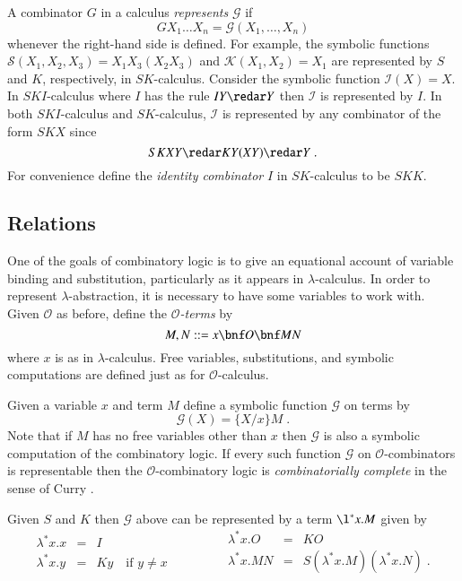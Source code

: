 \documentclass{llncs}
\renewcommand{\rew}{\redar}
\begin{document}
A combinator $G$ in a calculus {\em represents} ${\mathcal G}$ if
\[
GX_1\ldots X_n = {\mathcal G}(X_1,\ldots,X_n)
\]
whenever the right-hand side is defined.  For example, the symbolic
functions
${\mathcal S}(X_1,X_2,X_3) = X_1X_3(X_2X_3)$ and
${\mathcal K}(X_1,X_2) = X_1$
are represented by $S$ and $K$, respectively, 
in $SK$-calculus.
  Consider the
symbolic function
${\mathcal I}(X) = X$. 
In $SKI$-calculus where $I$ has the rule
$IY \rew Y$
then ${\mathcal I}$ is represented by $I$. In both $SKI$-calculus and
$SK$-calculus, ${\mathcal I}$ is represented by any combinator of the
form $SKX$ since
\[
SKXY \redar KY(XY) \redar Y\;.
\]
For convenience define the {\em identity combinator} $I$ in $SK$-calculus to be $SKK$.


\subsection{Relations}
\label{sec:lambda=SK}



One of the goals of combinatory logic is to give an equational account
of variable binding and substitution, particularly as it appears in
$\lambda$-calculus.
In order to represent $\lambda$-abstraction, it is necessary to have some
variables to work with. Given ${\mathcal O}$ as before, define the
{\em ${\mathcal O}$-terms} by 
\[
M,N ::= x \bnf O \bnf MN 
\]
where $x$ is as in $\lambda$-calculus.
Free variables, substitutions, and symbolic computations are defined
just as for ${\mathcal O}$-calculus.

Given a variable $x$ and term $M$ define a symbolic function ${\mathcal G}$ on terms by 
\[
{\mathcal G}(X) = \{X/x\}M\; .
\]
Note that if $M$ has no free variables other than $x$ then ${\mathcal G}$
is also a symbolic computation of the combinatory logic.  If every
such function ${\mathcal G}$ on ${\mathcal O}$-combinators is representable then the
${\mathcal O}$-combinatory logic is {\em combinatorially complete} in the
sense of Curry \cite[p.~5]{Curry58combinatorylogic}.


Given $S$ and $K$ then ${\mathcal G}$ above can be
represented by a term $\l^* x.M$ given by
\begin{equation*}
\begin{array}{rcl}
\lambda^{*}x.x &=& I\\
\lambda^{*}x.y &=& K y \quad\mbox{if $y\neq x$}
\end{array}\qquad\qquad
\begin{array}{rcl}
\lambda^{*}x.O &=& KO  \\
\lambda^{*}x.M N &=& S (\lambda^{*}x.M) (\lambda^{*}x.N) \; .
\end{array}
\end{equation*}
\end{document}
